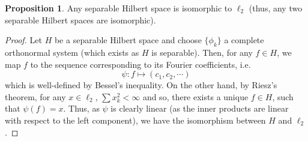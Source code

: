 \documentclass[]{article}
\theoremstyle{definition}
\theoremstyle{definition}
\newtheorem{proposition}{Proposition}[section]
\begin{document}
\begin{proposition}
  Any separable Hilbert space is isomorphic to \(\ell_2\) (thus, any two separable 
  Hilbert spaces are isomorphic). 
\end{proposition}
\begin{proof}
  Let \(H\) be a separable Hilbert space and choose \(\{\phi_k\}\) a complete 
  orthonormal system (which exists as \(H\) is separable). Then, for any \(f \in H\), 
  we map \(f\) to the sequence corresponding to its Fourier coefficients, i.e.
  \[\psi : f \mapsto (c_1, c_2, \cdots)\]
  which is well-defined by Bessel's inequality. On the other hand, by Riesz's 
  theorem, for any \(x \in \ell_2\), \(\sum x_k^2 < \infty\) and so, there 
  exists a unique \(f \in H\),  such that \(\psi(f) = x\). Thus, as \(\psi\) is 
  clearly linear (as the inner products are linear with respect to the left 
  component), we have the isomorphism between \(H\) and \(\ell_2\).
\end{proof}
\end{document}
